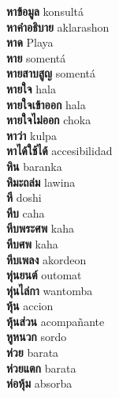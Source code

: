 \textbf{ หาข้อมูล  } konsultá \\
\textbf{ หาคำอธิบาย  } aklarashon \\
\textbf{ หาด  } Playa \\
\textbf{ หาย  } somentá \\
\textbf{ หายสาบสูญ  } somentá \\
\textbf{ หายใจ  } hala \\
\textbf{ หายใจเข้าออก  } hala \\
\textbf{ หายใจไม่ออก  } choka \\
\textbf{ หาว่า  } kulpa \\
\textbf{ หาได้ใช้ได้  } accesibilidad \\
\textbf{ หิน  } baranka \\
\textbf{ หิมะถล่ม  } lawina \\
\textbf{ หี  } doshi \\
\textbf{ หีบ  } caha \\
\textbf{ หีบพระศพ  } kaha \\
\textbf{ หีบศพ  } kaha \\
\textbf{ หีบเพลง  } akordeon \\
\textbf{ หุ่นยนต์  } outomat \\
\textbf{ หุ่นไล่กา  } wantomba \\
\textbf{ หุ้น  } accion \\
\textbf{ หุ้นส่วน  } acompañante \\
\textbf{ หูหนวก  } sordo \\
\textbf{ ห่วย  } barata \\
\textbf{ ห่วยแตก  } barata \\
\textbf{ ห่อหุ้ม  } absorba \\
